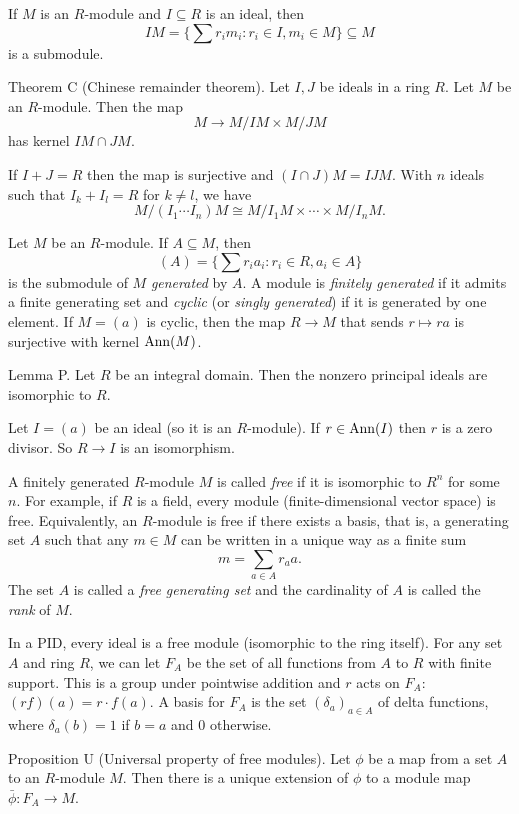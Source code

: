 If $M$ is an $R$-module and $I\subseteq R$ is an ideal, then
$$IM = \Big\{\sum r_im_i : r_i\in I, m_i\in M\Big\} \subseteq M$$
is a submodule.

\parenproclaim Theorem C (Chinese remainder theorem). Let $I,J$ be ideals in a ring $R$. Let $M$ be an $R$-module. Then the map
$$M\to M/IM \times M/JM$$
has kernel $IM\cap JM$.\slug

If $I+J = R$ then the map is surjective and $(I\cap J)M = IJM$. With $n$ ideals such that $I_k + I_l = R$ for $k\neq l$, we have
$$M/(I_1\cdots I_n)M \cong M/I_1M \times \cdots \times M/I_nM.$$

Let $M$ be an $R$-module. If $A\subseteq M$, then
$$(A) = \Big\{\sum r_ia_i : r_i\in R, a_i \in A\Big\}$$
is the submodule of $M$ {\it generated} by $A$. A module is {\it finitely generated} if it admits a finite generating set and {\it cyclic} (or {\it singly generated}) if it is generated by one element. If $M = (a)$ is cyclic, then the map $R\to M$ that sends $r\mapsto ra$ is surjective with kernel $\mathop {\rm Ann}(M)$.

\proclaim Lemma P. Let $R$ be an integral domain. Then the nonzero principal ideals are isomorphic to $R$.

\proof Let $I = (a)$ be an ideal (so it is an $R$-module). If $r\in \mathop {\rm Ann}(I)$ then $r$ is a zero divisor. So $R\to I$ is an isomorphism.\slug

A finitely generated $R$-module $M$ is called {\it free} if it is isomorphic to $R^n$ for some $n$. For example, if $R$ is a field, every module (finite-dimensional vector space) is free. Equivalently, an $R$-module is free if there exists a basis, that is, a generating set $A$ such that any $m\in M$ can be written in a unique way as a finite sum
$$m = \sum_{a\in A} r_a a.$$
The set $A$ is called a {\it free generating set} and the cardinality of $A$ is called the {\it rank} of $M$.

In a PID, every ideal is a free module (isomorphic to the ring itself). For any set $A$ and ring $R$, we can let $F_A$ be the set of all functions from $A$ to $R$ with finite support. This is a group under pointwise addition and $r$ acts on $F_A$: $(rf)(a) = r\cdot f(a)$. A basis for $F_A$ is the set $(\delta_a)_{a\in A}$ of delta functions, where $\delta_a(b) = 1$ if $b=a$ and $0$ otherwise.

\parenproclaim Proposition U (Universal property of free modules). Let $\phi$ be a map from a set $A$ to an $R$-module $M$. Then there is a unique extension of $\phi$ to a module map $\bar\phi : F_A\to M$.

